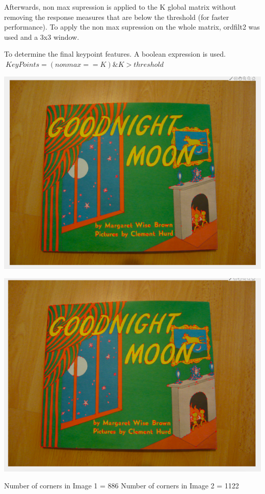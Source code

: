 \documentclass[]{article}
\begin{document}
Afterwards, non max supression is applied to the K global matrix without removing the response measures that are below the threshold (for faster performance). To apply the non max supression on the whole matrix, ordfilt2 was used and a 3x3 window. 

To determine the final keypoint features. A boolean expression is used. 
$\ KeyPoints = (nonmax == K)  \&   K > threshold$

\includegraphics{l1_corners.png}

\includegraphics{l2_corners.png}

Number of corners in Image 1 = 886 \newline
Number of corners in Image 2 = 1122
\end{document}
